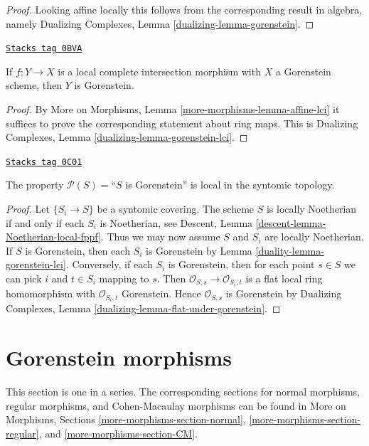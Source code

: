 \begin{proof}
Looking affine locally this follows from the corresponding
result in algebra, namely
Dualizing Complexes, Lemma \ref{dualizing-lemma-gorenstein}.
\end{proof}

\begin{lemma}
\label{duality-lemma-gorenstein-lci}
\href{https://stacks.math.columbia.edu/tag/0BVA}{\texttt{Stacks tag 0BVA}}

If $f : Y \to X$ is a local complete intersection morphism
with $X$ a Gorenstein scheme, then $Y$ is Gorenstein.
\end{lemma}

\begin{proof}
By More on Morphisms, Lemma \ref{more-morphisms-lemma-affine-lci}
it suffices to prove the corresponding statement about ring maps.
This is Dualizing Complexes, Lemma \ref{dualizing-lemma-gorenstein-lci}.
\end{proof}

\begin{lemma}
\label{duality-lemma-gorenstein-local-syntomic}
\href{https://stacks.math.columbia.edu/tag/0C01}{\texttt{Stacks tag 0C01}}

The property $\mathcal{P}(S) =$``$S$ is Gorenstein''
is local in the syntomic topology.
\end{lemma}

\begin{proof}

Let $\{S_i \to S\}$ be a syntomic covering. The scheme $S$ is locally
Noetherian if and only if each $S_i$ is Noetherian, see
Descent, Lemma \ref{descent-lemma-Noetherian-local-fppf}.
Thus we may now assume $S$ and $S_i$ are locally Noetherian.
If $S$ is Gorenstein, then
each $S_i$ is Gorenstein by Lemma \ref{duality-lemma-gorenstein-lci}.
Conversely, if each $S_i$ is Gorenstein, then for each point
$s \in S$ we can pick $i$ and $t \in S_i$ mapping to $s$.
Then $\mathcal{O}_{S, s} \to \mathcal{O}_{S_i, t}$
is a flat local ring homomorphism with $\mathcal{O}_{S_i, t}$
Gorenstein. Hence $\mathcal{O}_{S, s}$ is Gorenstein by
Dualizing Complexes, Lemma \ref{dualizing-lemma-flat-under-gorenstein}.
\end{proof}

\section{Gorenstein morphisms}
\label{duality-section-gorenstein-morphisms}
This section is one in a series. The corresponding sections for
normal morphisms,
regular morphisms, and
Cohen-Macaulay morphisms
can be found in More on Morphisms, Sections
\ref{more-morphisms-section-normal},
\ref{more-morphisms-section-regular}, and
\ref{more-morphisms-section-CM}.

